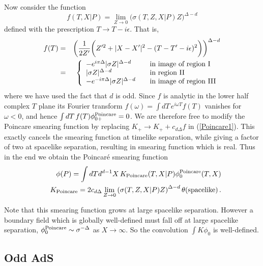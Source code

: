 \documentclass[12pt]{article}
\begin{document}
Now consider the function
\[
f(T,X \vert P) = \lim_{Z \rightarrow 0} \bigl(\sigma(T,Z,X \vert P) Z\bigr)^{\Delta - d}
\]
defined with the prescription $T \rightarrow T - i \epsilon$.  That is,
\begin{eqnarray*}
f(T) & = & \left({1 \over 2 Z'} \bigg(Z'^2 + \vert X - X' \vert^2 - (T - T' - i \epsilon)^2 \bigg)\right)^{\Delta - d} \\
& = & \left\lbrace\begin{array}{ll}
- e^{i \pi \Delta} \vert \sigma Z \vert^{\Delta - d} & \quad \hbox{\rm in image of region I} \\
                   \vert \sigma Z \vert^{\Delta - d} & \quad \hbox{\rm in region II} \\
- e^{-i \pi \Delta} \vert \sigma Z \vert^{\Delta - d} & \quad \hbox{\rm in image of region III}
\end{array}\right.
\end{eqnarray*}
where we have used the fact that $d$ is odd.  Since $f$ is analytic in
the lower half complex $T$ plane its Fourier transform $f(\omega) =
\int dT \, e^{i \omega T} f(T)$ vanishes for $\omega < 0$, and hence $\int
dT \, f(T) \phi_{0+}^{\rm Poincare} = 0$.  We are therefore free to
modify the Poincare smearing function by replacing $K_{+} \rightarrow
K_{+} + c_{d\Delta} f$ in (\ref{Poincare1}).  This exactly cancels the
smearing function at timelike separation, while giving a factor of two
at spacelike separation, resulting in smearing function which is real.
Thus in the end we obtain the Poincar\'e smearing function
\begin{eqnarray}
\label{PoincareEvenSmear}
&&\phi(P) = \int dT d^{d-1}X \, K_{\rm Poincare}(T,X \vert P) \phi_0^{\rm Poincare}(T,X) \\
\nonumber
&&K_{\rm Poincare} = 2 c_{d\Delta} \lim_{Z \rightarrow 0} \left(\sigma(T,Z,X \vert P) Z\right)^{\Delta - d}
\theta({\rm spacelike})\,.
\end{eqnarray}

Note that this smearing function grows at large spacelike separation.
However a boundary field which is globally well-defined must fall off
at large spacelike separation, $\phi_0^{\rm Poincare} \sim
\sigma^{-\Delta}$ as $X \rightarrow \infty$. So the convolution $\int
K \phi_0$ is well-defined.

\subsection{Odd AdS}
\label{sect:OddAdSPoincare}
\end{document}

